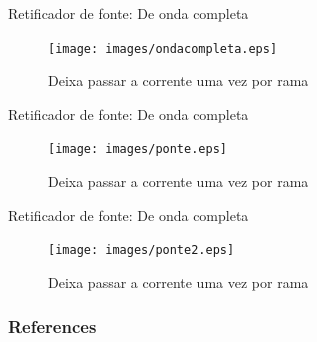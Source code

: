 \documentclass[envcountsect,dvips]{beamer}
\begin{document}
\begin{frame}{Retificador de fonte: De onda completa}
\begin{figure}
\centering
\texttt{[image: images/ondacompleta.eps]}
\caption{Deixa passar a corrente uma vez por rama }
\label{fig:ondacompleta}
\end{figure}
\end{frame}

\begin{frame}{Retificador de fonte: De onda completa}
\begin{figure}
\centering
\texttt{[image: images/ponte.eps]}
\caption{Deixa passar a corrente uma vez por rama }
\label{fig:ponte}
\end{figure}
\end{frame}

\begin{frame}{Retificador de fonte: De onda completa}
\begin{figure}
\centering
\texttt{[image: images/ponte2.eps]}
\caption{Deixa passar a corrente uma vez por rama }
\label{fig:ponte2}
\end{figure}
\end{frame}

\begin{frame}[allowframebreaks]
        \frametitle{References}
        

\end{frame}
\end{document}
